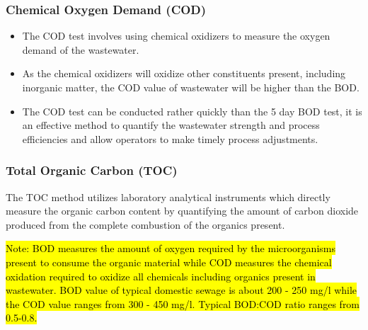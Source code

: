 \begin{itemize}
			    \subsubsection{Chemical Oxygen Demand (COD)}
			      	\begin{itemize}
			      		\item The COD test involves using chemical oxidizers to measure the oxygen demand of the wastewater.
			      		\item As the chemical oxidizers will oxidize other constituents present, including inorganic matter, the COD value of wastewater will be higher than the BOD.  
			      		\item The COD test can be conducted rather quickly than the 5 day BOD test, it is an effective method to quantify the wastewater strength and process efficiencies and allow operators to make timely process adjustments.
			      	\end{itemize}

			    \subsubsection{Total Organic Carbon (TOC)}
			      	The TOC method utilizes laboratory analytical instruments which directly measure the organic carbon content by quantifying the amount of carbon dioxide produced from the complete combustion of the organics present.
		\end{itemize}
		
		
		
			\hl{Note: BOD measures the amount of oxygen required by the microorganisms present to consume the organic material while COD measures the chemical oxidation required to oxidize all chemicals including organics present in wastewater.  BOD value of typical domestic sewage is about 200 - 250 mg/l while the COD value ranges from 300 - 450 mg/l.  Typical BOD:COD ratio ranges from 0.5-0.8.}\\
